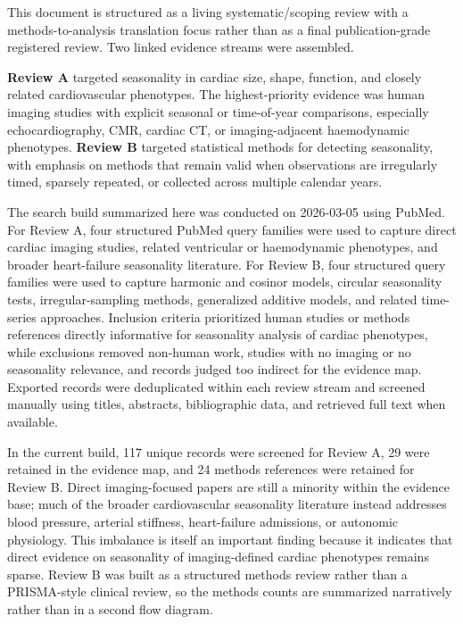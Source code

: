 This document is structured as a living systematic/scoping review with a methods-to-analysis translation focus rather than as a final publication-grade registered review. Two linked evidence streams were assembled.

\textbf{Review A} targeted seasonality in cardiac size, shape, function, and closely related cardiovascular phenotypes. The highest-priority evidence was human imaging studies with explicit seasonal or time-of-year comparisons, especially echocardiography, CMR, cardiac CT, or imaging-adjacent haemodynamic phenotypes. \textbf{Review B} targeted statistical methods for detecting seasonality, with emphasis on methods that remain valid when observations are irregularly timed, sparsely repeated, or collected across multiple calendar years.

The search build summarized here was conducted on 2026-03-05 using PubMed. For Review A, four structured PubMed query families were used to capture direct cardiac imaging studies, related ventricular or haemodynamic phenotypes, and broader heart-failure seasonality literature. For Review B, four structured query families were used to capture harmonic and cosinor models, circular seasonality tests, irregular-sampling methods, generalized additive models, and related time-series approaches. Inclusion criteria prioritized human studies or methods references directly informative for seasonality analysis of cardiac phenotypes, while exclusions removed non-human work, studies with no imaging or no seasonality relevance, and records judged too indirect for the evidence map. Exported records were deduplicated within each review stream and screened manually using titles, abstracts, bibliographic data, and retrieved full text when available.



In the current build, 117 unique records were screened for Review A, 29 were retained in the evidence map, and 24 methods references were retained for Review B. Direct imaging-focused papers are still a minority within the evidence base; much of the broader cardiovascular seasonality literature instead addresses blood pressure, arterial stiffness, heart-failure admissions, or autonomic physiology. This imbalance is itself an important finding because it indicates that direct evidence on seasonality of imaging-defined cardiac phenotypes remains sparse. Review B was built as a structured methods review rather than a PRISMA-style clinical review, so the methods counts are summarized narratively rather than in a second flow diagram.

